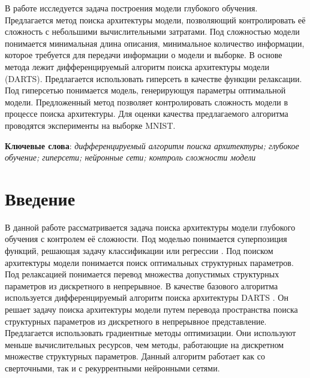 \documentclass[12pt, twoside]{article}
\begin{document}
\abstract
    {В работе исследуется задача построения модели глубокого обучения. Предлагается метод поиска архитектуры модели, позволяющий контролировать её сложность с небольшими вычислительными затратами. Под сложностью модели понимается минимальная длина описания,
минимальное количество информации, которое требуется для передачи информации о модели и выборке. В основе метода лежит дифференцируемый алгоритм поиска архитектуры модели (DARTS). Предлагается использовать гиперсеть в качестве функции релаксации.  Под гиперсетью понимается модель, генерирующуя параметры оптимальной модели. Предложенный метод позволяет контролировать сложность модели в процессе поиска архитектуры. Для оценки качества предлагаемого алгоритма проводятся эксперименты на выборке MNIST.

	
\bigskip
\noindent
\textbf{Ключевые слова}: \emph {дифференцируемый алгоритм поиска архитектуры; глубокое обучение; гиперсети; нейронные сети; контроль сложности модели}
}





\maketitle
\linenumbers

\section{Введение}


В данной работе рассматривается задача поиска архитектуры модели глубокого обучения с контролем её сложности. Под моделью понимается суперпозиция функций, решающая задачу классификации или регрессии \cite{journals/aarc/BakhteevS18}. Под поиском архитектуры модели понимается поиск оптимальных структурных параметров. Под релаксацией понимается перевод множества допустимых структурных параметров из дискретного в непрерывное. В качестве базового алгоритма используется дифференцируемый алгоритм поиска архитектуры DARTS \cite{journals/corr/abs-1806-09055}. Он решает задачу поиска архитектуры модели путем перевода пространства поиска структурных параметров из дискретного в непрерывное представление. Предлагается использовать градиентные методы оптимизации. Они используют меньше вычислительных ресурсов, чем методы, работающие на дискретном множестве структурных параметров. Данный алгоритм работает как со сверточными, так и с рекуррентными нейронными сетями.
\end{document}
